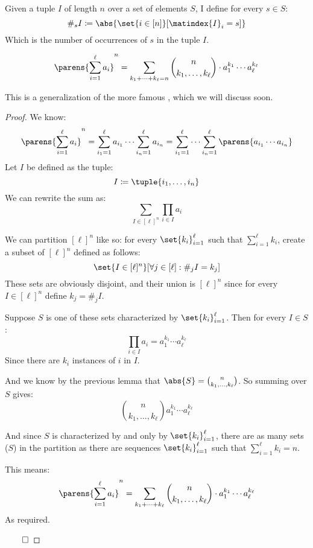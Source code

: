 \newpage
\begin{defn*}

	Given a tuple $I$ of length $n$ over a set of elements $S$, I define for every $s\in S$:
	\[ \#_s I\coloneqq\abs{\set{i\in[n]}[\matindex{I}_i=s]} \]
	Which is the number of occurrences of $s$ in the tuple $I$.

\end{defn*}

\begin{thrm*}

	\[ \parens{\sum_{i=1}^\ell a_i}^n = \sum_{k_1+\cdots+k_\ell=n} \binom{n}{k_1,\dots,k_\ell}\cdot a_1^{k_1}\cdots a_\ell^{k_\ell} \]

	This is a generalization of the more famous , which we will discuss soon.

\end{thrm*}

\begin{proof}

	We know:
	\[ \parens{\sum_{i=1}^\ell a_i}^n = \sum_{i_1=1}^\ell a_{i_1} \cdots\sum_{i_n=1}^\ell a_{i_n} =
	\sum_{i_1=1}^\ell\cdots\sum_{i_n=1}^\ell\parens{a_{i_1}\cdots a_{i_n}} \]
	Let $I$ be defined as the tuple:
	\[ I\coloneqq\tuple{i_1,\dots,i_n} \]
	We can rewrite the sum as:
	\[ \sum_{I\in[\ell]^n} \prod_{i\in I} a_i \]

	We can partition $[\ell]^n$ like so: for every $\set{k_i}_{i=1}^\ell$ such that $\sum\limits_{i=1}^\ell k_i$, create a
	subset of $[\ell]^n$ defined as follows:
	\[ \set{I\in[\ell]^n}[\forall j\in[\ell]: \#_j I = k_j] \]
	These sets are obviously disjoint, and their union is $[\ell]^n$ since for every $I\in[\ell]^n$ define $k_j=\#_j I$.

	Suppose $S$ is one of these sets characterized by $\set{k_i}_{i=1}^\ell$. Then for every $I\in S$:
	\[ \prod_{i\in I} a_i = a_1^{k_1}\cdots a_\ell^{k_\ell} \]
	Since there are $k_i$ instances of $i$ in $I$.

	And we know by the previous lemma that $\abs{S}=\binom{n}{k_1,\dots,k_\ell}$. So summing over $S$ gives:
	\[ \binom{n}{k_1,\dots,k_\ell}a_1^{k_1}\cdots a_\ell^{k_\ell} \]
	
	And since $S$ is characterized by and only by $\set{k_i}_{i=1}^\ell$, there are as many sets ($S$) in the partition as
	there are sequences $\set{k_i}_{i=1}^\ell$ such that $\sum\limits_{i=1}^\ell k_i = n$.

	This means:
	\[ \parens{\sum_{i=1}^\ell a_i}^n = \sum_{k_1+\cdots+k_\ell} \binom{n}{k_1,\dots,k_\ell}\cdot a_1^{k_1}\cdots a_{\ell}^{k_\ell} \]
	As required.

\hfill$\qed$

\end{proof}

